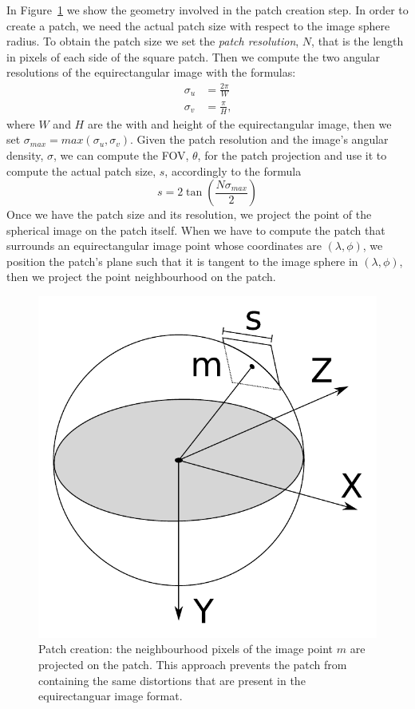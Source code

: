 In Figure~\ref{fig:patch} we show the geometry involved in the
patch creation step. In order to create a patch, we need the actual patch size
with respect to the image sphere radius. To obtain the patch size we set the
\emph{patch resolution}, $N$, that is the length in pixels of each side of the
square patch. Then we compute the two angular
resolutions of the equirectangular image with the formulas:
%
\begin{subequations}
	\label{eq:angular_resolution}
	\begin{align}
	\sigma_u &= \frac{2\pi}{W} \\
	\sigma_v &= \frac{\pi}{H}	\text{,}
	\end{align}
\end{subequations}
%
\noindent where $W$ and $H$ are the with and height of the equirectangular
image, then we set $\sigma_{max} = max(\sigma_u, \sigma_v)$.
Given the patch resolution and the image's angular density, $\sigma$, we can
compute the FOV, $\theta$, for the patch projection and use it to compute
the actual patch size, $s$, accordingly to the formula
%
\begin{equation*}
s = 2\tan\left(\frac{N\sigma_{max}}{2}\right)
\end{equation*}
%
Once we have the patch size and its resolution, we project the point of the
spherical image on the patch itself.
When we have to compute the patch that surrounds an equirectangular image point
whose coordinates are $(\lambda,\phi)$, we position the patch's plane such that
it is tangent to the image sphere in $(\lambda, \phi)$, then we project
the point neighbourhood on the patch.
%
\begin{figure}
\centering
\includegraphics[width=0.7\linewidth]{img/patch_creation.pdf}
\caption{Patch creation: the neighbourhood pixels of the image point $m$
are projected on the patch. This approach prevents the patch from containing
the same distortions that are present in the equirectanguar image format.}
	\label{fig:patch}
\end{figure}
%
